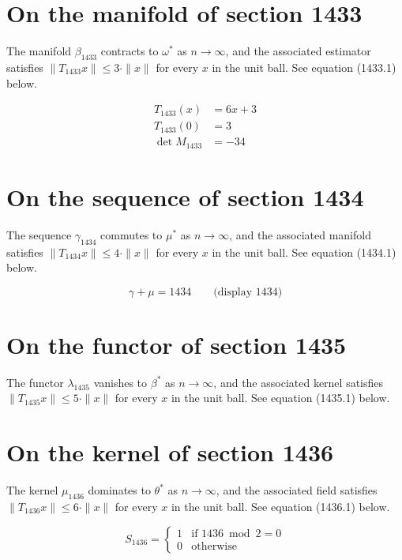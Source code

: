 \documentclass{article}
\begin{document}
\section{On the manifold of section 1433}
The manifold $\beta_{1433}$ contracts to $\omega^{*}$ as $n \to \infty$,
and the associated estimator satisfies $\|T_{1433} x\| \leq 3 \cdot \|x\|$
for every $x$ in the unit ball. See equation (1433.1) below.

\begin{align}
T_{1433}(x) &= 6 x + 3 \\
T_{1433}(0) &= 3 \\
\det M_{1433} &= -34
\end{align}

\section{On the sequence of section 1434}
The sequence $\gamma_{1434}$ commutes to $\mu^{*}$ as $n \to \infty$,
and the associated manifold satisfies $\|T_{1434} x\| \leq 4 \cdot \|x\|$
for every $x$ in the unit ball. See equation (1434.1) below.

$$
\gamma + \mu = 1434 \qquad \text{(display 1434)}
$$

\section{On the functor of section 1435}
The functor $\lambda_{1435}$ vanishes to $\beta^{*}$ as $n \to \infty$,
and the associated kernel satisfies $\|T_{1435} x\| \leq 5 \cdot \|x\|$
for every $x$ in the unit ball. See equation (1435.1) below.

\section{On the kernel of section 1436}
The kernel $\mu_{1436}$ dominates to $\theta^{*}$ as $n \to \infty$,
and the associated field satisfies $\|T_{1436} x\| \leq 6 \cdot \|x\|$
for every $x$ in the unit ball. See equation (1436.1) below.

\begin{equation}
S_{1436} = \begin{cases} 1 & \text{if } 1436 \bmod 2 = 0 \\ 0 & \text{otherwise} \end{cases}
\end{equation}
\end{document}
